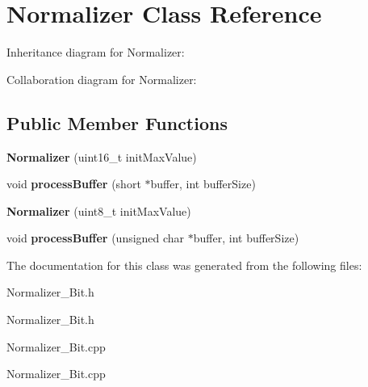 \hypertarget{classNormalizer}{}\section{Normalizer Class Reference}
\label{classNormalizer}


Inheritance diagram for Normalizer\+:


Collaboration diagram for Normalizer\+:
\subsection*{Public Member Functions}
\begin{DoxyCompactItemize}
\item 
\mbox{\label{classNormalizer_ab85bc5a7165e6405ed65f833ba2aa517}} 
{\bfseries Normalizer} (uint16\+\_\+t init\+Max\+Value)
\item 
\mbox{\label{classNormalizer_ac906afc6be45489554933b57667a3966}} 
void {\bfseries process\+Buffer} (short $\ast$buffer, int buffer\+Size)
\item 
\mbox{\label{classNormalizer_ac46cdf084a1894e6a53f386e6ac427ff}} 
{\bfseries Normalizer} (uint8\+\_\+t init\+Max\+Value)
\item 
\mbox{\label{classNormalizer_a4f3bad3ee076db14dc1edcd82368eaba}} 
void {\bfseries process\+Buffer} (unsigned char $\ast$buffer, int buffer\+Size)
\end{DoxyCompactItemize}


The documentation for this class was generated from the following files\+:\begin{DoxyCompactItemize}
\item 
Normalizer\+\_\+Bit.\+h\item 
Normalizer\+\_\+Bit.\+h\item 
Normalizer\+\_\+Bit.\+cpp\item 
Normalizer\+\_\+Bit.\+cpp\end{DoxyCompactItemize}
